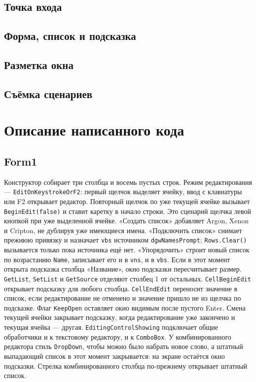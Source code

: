 \documentclass[a4paper,14pt]{extarticle}
\begin{document}
\subsection{Точка входа}
\subsection{Форма, список и подсказка}
\subsection{Разметка окна}
\subsection{Съёмка сценариев}
\section{Описание написанного кода}
\subsection{Form1}
Конструктор собирает три столбца и восемь пустых строк. Режим редактирования --- \texttt{EditOnKeystrokeOrF2}: первый щелчок выделяет ячейку, ввод с клавиатуры или F2 открывает редактор. Повторный щелчок по уже текущей ячейке вызывает \texttt{BeginEdit(false)} и ставит каретку в начало строки. Это сценарий щелчка левой кнопкой при уже выделенной ячейке.
«Создать список» добавляет Argon, Xenon и Cripton, не дублируя уже имеющиеся имена. «Подключить список» снимает прежнюю привязку и назначает \texttt{vbs} источником \texttt{dgwNamesPrompt}; \texttt{Rows.Clear()} вызывается только пока источника ещё нет. «Упорядочить» строит новый список по возрастанию \texttt{Name}, записывает его и в \texttt{vns}, и в \texttt{vbs}. Если в этот момент открыта подсказка столбца «Название», окно подсказки пересчитывает размер.
\texttt{GetList}, \texttt{SetList} и \texttt{GetSource} отделяют столбец 1 от остальных. \texttt{CellBeginEdit} открывает подсказку для любого столбца. \texttt{CellEndEdit} переносит значение в список, если редактирование не отменено и значение пришло не из щелчка по подсказке. Флаг \texttt{KeepOpen} оставляет окно видимым после пустого Enter. Смена текущей ячейки закрывает подсказку, когда редактирование уже закончено и текущая ячейка --- другая.
\texttt{EditingControlShowing} подключает общие обработчики и к текстовому редактору, и к \texttt{ComboBox}. У комбинированного редактора стиль \texttt{DropDown}, чтобы можно было набрать новое слово, а штатный выпадающий список в этот момент закрывается: на экране остаётся окно подсказки. Стрелка комбинированного столбца по-прежнему открывает штатный список.
\end{document}
